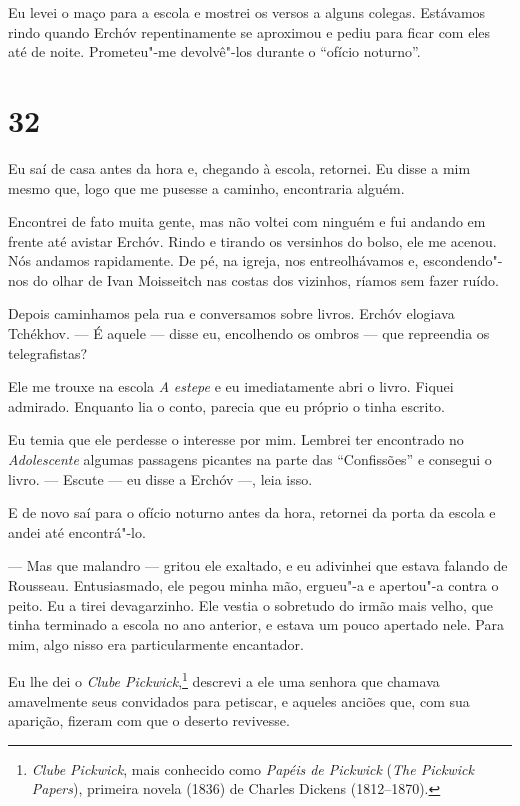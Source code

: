 Eu levei o maço para a escola e mostrei os versos a alguns colegas.
Estávamos rindo quando Erchóv repentinamente se aproximou e pediu para
ficar com eles até de noite. Prometeu"-me devolvê"-los durante o ``ofício
noturno''.

\section{32}

Eu saí de casa antes da hora e, chegando à escola, retornei. Eu disse a
mim mesmo que, logo que me pusesse a caminho, encontraria alguém.

Encontrei de fato muita gente, mas não voltei com ninguém e fui andando
em frente até avistar Erchóv. Rindo e tirando os versinhos do bolso, ele
me acenou. Nós andamos rapidamente. De pé, na igreja, nos entreolhávamos
e, escondendo"-nos do olhar de Ivan Moisseitch nas costas dos vizinhos,
ríamos sem fazer ruído.

Depois caminhamos pela rua e conversamos sobre livros. Erchóv elogiava
Tchékhov. --- É aquele --- disse eu, encolhendo os ombros --- que
repreendia os telegrafistas?

Ele me trouxe na escola \emph{A} \emph{estepe} e eu imediatamente abri o
livro. Fiquei admirado. Enquanto lia o conto, parecia que eu próprio o
tinha escrito.

Eu temia que ele perdesse o interesse por mim. Lembrei ter encontrado no
\emph{Adolescente} algumas passagens picantes na parte das
``Confissões'' e consegui o livro. --- Escute --- eu disse a Erchóv ---,
leia isso.

E de novo saí para o ofício noturno antes da hora, retornei da porta da
escola e andei até encontrá"-lo.

--- Mas que malandro --- gritou ele exaltado, e eu adivinhei que estava
falando de Rousseau. Entusiasmado, ele pegou minha mão, ergueu"-a e
apertou"-a contra o peito. Eu a tirei devagarzinho. Ele vestia o
sobretudo do irmão mais velho, que tinha terminado a escola no ano
anterior, e estava um pouco apertado nele. Para mim, algo nisso era
particularmente encantador.

Eu lhe dei o \emph{Clube Pickwick},\footnote{\emph{Clube Pickwick}, mais
  conhecido como \emph{Papéis de Pickwick} (\emph{The Pickwick Papers}),
  primeira novela (1836) de Charles Dickens (1812--1870).} descrevi a
ele uma senhora que chamava amavelmente seus convidados para petiscar, e
aqueles anciões que, com sua aparição, fizeram com que o deserto
revivesse.

